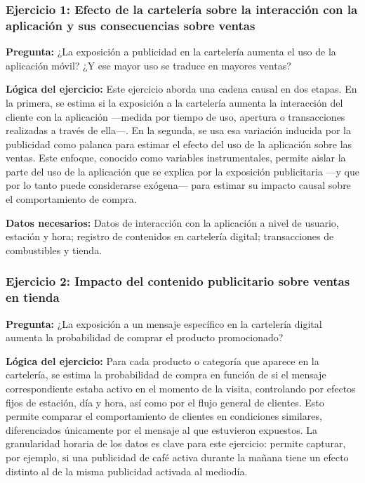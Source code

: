\subsubsection*{Ejercicio 1: Efecto de la cartelería sobre la interacción con 
la aplicación y sus consecuencias sobre ventas}

\textbf{Pregunta:} ¿La exposición a publicidad en la cartelería aumenta el uso de 
la aplicación móvil? ¿Y ese mayor uso se traduce en mayores ventas?

\textbf{Lógica del ejercicio:} Este ejercicio aborda una cadena causal en dos 
etapas. En la primera, se estima si la exposición a la cartelería aumenta la 
interacción del cliente con la aplicación —medida por tiempo de uso, apertura o 
transacciones realizadas a través de ella—. En la segunda, se usa esa variación 
inducida por la publicidad como palanca para estimar el efecto del uso de la 
aplicación sobre las ventas. Este enfoque, conocido como variables instrumentales, 
permite aislar la parte del uso de la aplicación que se explica por la exposición 
publicitaria —y que por lo tanto puede considerarse exógena— para estimar su 
impacto causal sobre el comportamiento de compra.

\textbf{Datos necesarios:} Datos de interacción con la aplicación a nivel de 
usuario, estación y hora; registro de contenidos en cartelería digital; 
transacciones de combustibles y tienda.


\subsubsection*{Ejercicio 2: Impacto del contenido publicitario sobre ventas 
en tienda}

\textbf{Pregunta:} ¿La exposición a un mensaje específico en la cartelería digital 
aumenta la probabilidad de comprar el producto promocionado?

\textbf{Lógica del ejercicio:} Para cada producto o categoría que aparece en la 
cartelería, se estima la probabilidad de compra en función de si el mensaje 
correspondiente estaba activo en el momento de la visita, controlando por efectos 
fijos de estación, día y hora, así como por el flujo general de clientes. Esto permite 
comparar el comportamiento de clientes en condiciones similares, diferenciados 
únicamente por el mensaje al que estuvieron expuestos. La granularidad horaria de 
los datos es clave para este ejercicio: permite capturar, por ejemplo, si una 
publicidad de café activa durante la mañana tiene un efecto distinto al de la misma 
publicidad activada al mediodía.

